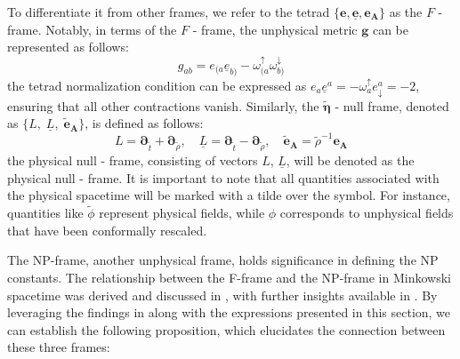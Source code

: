 To differentiate it from other frames, we refer to the tetrad $\{\boldsymbol{e}, \underline{\boldsymbol{e}}, \boldsymbol{e}_{\boldsymbol{A}}\}$ as the $F$ - frame. Notably, in terms of the $F$ - frame, the unphysical metric $\boldsymbol{g}$ can be represented as follows:
\begin{equation}\label{eq:UnphysicalMetricNullTetrad}
  g_{a b}=e_{(a} \underline{e}_{b)}-\omega_{(a}^{\uparrow} \omega_{b)}^{\downarrow}
\end{equation}
the tetrad normalization condition can be expressed as $e_a \underline{e}^a=-\omega^{\uparrow}_ae_{\downarrow}^a=-2$, ensuring that all other contractions vanish. Similarly, the $\tilde{\boldsymbol{\eta}}$ - null frame, denoted as $\{L, \; \underline{L},\; \tilde{\boldsymbol{e}}_{\boldsymbol{A}}\}$, is defined as follows:
\begin{equation}
  L=\boldsymbol{\partial}_{\tilde{t}}+\boldsymbol{\partial}_{\tilde{\rho}}, \quad \underline{L}=\boldsymbol{\partial}_{\tilde{t}}-\boldsymbol{\partial}_{\tilde{\rho}}, \quad \tilde{\boldsymbol{e}}_{\boldsymbol{A}}=\tilde{\rho}^{-1} \boldsymbol{e}_{\boldsymbol{A}}
\end{equation}
the physical null - frame, consisting of vectors $L$, $\underline{L}$, will be denoted as the physical null - frame. It is important to note that all quantities associated with the physical spacetime will be marked with a tilde over the symbol. For instance, quantities like $\tilde{\phi}$ represent physical fields, while $\phi$ corresponds to unphysical fields that have been conformally rescaled.

\medskip
The NP-frame, another unphysical frame, holds significance in defining the NP constants. The relationship between the F-frame and the NP-frame in Minkowski spacetime was derived and discussed in \cite{GasKro16d}, with further insights available in \cite{ValAli22}. By leveraging the findings in \cite{GasKro16d} along with the expressions presented in this section, we can establish the following proposition, which elucidates the connection between these three frames:
 

